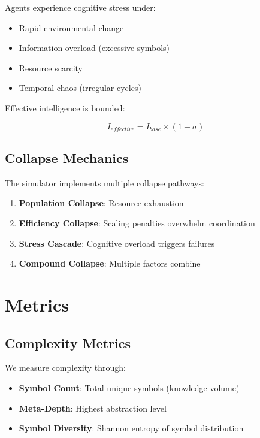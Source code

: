 \documentclass[11pt,a4paper]{article}
\begin{document}
Agents experience cognitive stress under:
\begin{itemize}
    \item Rapid environmental change
    \item Information overload (excessive symbols)
    \item Resource scarcity
    \item Temporal chaos (irregular cycles)
\end{itemize}

Effective intelligence is bounded:

\begin{equation}
I_{effective} = I_{base} \times (1 - \sigma)
\end{equation}

\subsection{Collapse Mechanics}

The simulator implements multiple collapse pathways:

\begin{enumerate}
    \item \textbf{Population Collapse}: Resource exhaustion
    \item \textbf{Efficiency Collapse}: Scaling penalties overwhelm coordination
    \item \textbf{Stress Cascade}: Cognitive overload triggers failures
    \item \textbf{Compound Collapse}: Multiple factors combine
\end{enumerate}

\section{Metrics}

\subsection{Complexity Metrics}

We measure complexity through:
\begin{itemize}
    \item \textbf{Symbol Count}: Total unique symbols (knowledge volume)
    \item \textbf{Meta-Depth}: Highest abstraction level
    \item \textbf{Symbol Diversity}: Shannon entropy of symbol distribution
\end{itemize}
\end{document}

